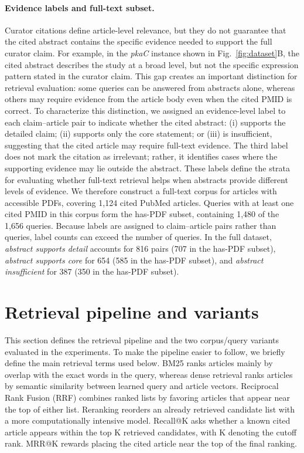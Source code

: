 \documentclass[runningheads]{llncs}
\begin{document}
\paragraph{Evidence labels and full-text subset.}
Curator citations define article-level relevance, but they do not guarantee that 
the cited abstract contains the specific evidence needed to support the full 
curator claim. 
For example, in the \emph{pkaC} instance shown in Fig.~\ref{fig:dataset}B, the cited abstract describes the study at a broad level, but not the specific expression pattern stated in the curator claim.
This gap creates an important distinction for retrieval evaluation: 
some queries can be answered from abstracts alone, whereas others 
may require evidence from the article body even when the cited PMID is correct. 
To characterize this distinction, we assigned an evidence-level label to each 
claim--article pair to indicate whether the cited abstract: (i) supports the detailed claim; 
(ii) supports only the core statement; or (iii) is insufficient, suggesting that 
the cited article may require full-text evidence. The third label does not mark 
the citation as irrelevant; rather, it identifies cases where the supporting 
evidence may lie outside the abstract. These labels define the strata for evaluating whether full-text retrieval helps when abstracts provide different levels of evidence. We therefore construct a full-text corpus for articles with accessible PDFs, covering 1,124 cited PubMed articles. Queries with at least one
cited PMID in this corpus form the has-PDF subset, containing 1,480 of the 1,656
queries. Because labels are assigned to claim--article pairs rather than queries,
label counts can exceed the number of queries. In the full dataset,
\emph{abstract supports detail} accounts for 816 pairs (707 in the has-PDF
subset), \emph{abstract supports core} for 654 (585 in the has-PDF subset), and \emph{abstract
insufficient} for 387 (350 in the has-PDF subset).

\FloatBarrier
\section{Retrieval pipeline and variants}
\label{sec:pipeline}

This section defines the retrieval pipeline and the two corpus/query variants evaluated in the experiments.
To make the pipeline easier to follow, we briefly define the main retrieval terms used below. BM25 ranks articles mainly by overlap with the exact words in the query, whereas dense retrieval ranks articles by semantic similarity between learned query and article vectors. Reciprocal Rank Fusion (RRF) combines ranked lists by favoring articles that appear near the top of either list. Reranking reorders an already retrieved candidate list with a more computationally intensive model. Recall@K asks whether a known cited article appears within the top K retrieved candidates, with K denoting the cutoff rank. MRR@K rewards placing the cited article near the top of the final ranking.
\end{document}
